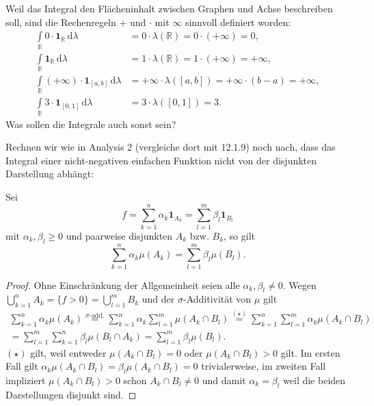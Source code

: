 \begin{beispiel1}
Weil das Integral den \glqq Fl\"acheninhalt\grqq{} zwischen Graphen und Achse beschreiben soll, sind die Rechenregeln $+$ und $\cdot$ mit $\infty$ sinnvoll definiert worden:
\begin{align*}
	 \int\limits_{\mathbb{R}} 0 \cdot \mathbf {1}_{\mathbb R} \,\mathrm{d}\lambda  &= 0\cdot \lambda(\mathbb{R} )= 0 \cdot (+\infty) = 0,\\
	 \int\limits_{\mathbb{R}} \mathbf{1}_{\mathbb R}\, \mathrm{d}\lambda &= 1 \cdot \lambda(\mathbb{R})= 1 \cdot (+\infty) = +\infty,\\
	 \int\limits_{\mathbb{R}} (+\infty)\cdot  \mathbf{1}_{[a,b]} \,\mathrm{d}\lambda &= +\infty \cdot \lambda([a,b] )= +\infty\cdot (b-a)=+\infty,\\
	 \int\limits_{\mathbb{R}} 3\cdot \mathbf{1}_{[0,1]}\, \mathrm{d}\lambda &= 3 \cdot \lambda([0,1] )= 3. 
\end{align*} 	 
Was sollen die Integrale auch sonst sein?
\end{beispiel1}

Rechnen wir wie in Analysis 2 (vergleiche dort mit 12.1.9) noch nach, dass das Integral einer nicht-negativen einfachen Funktion nicht von der disjunkten Darstellung abh\"angt:
\begin{lemma}
	Sei \[ f = \sum\limits_{k = 1}^{n} \alpha_k \mathbf{1}_{A_k} = \sum\limits_{l = 1}^{m} \beta_l \mathbf{1}_{B_l} \]
	mit $ \alpha_k, \beta_l \geq 0$ und paarweise disjunkten $A_k$ bzw. $B_k$, so gilt \[ \sum\limits_{k = 1}^{n} \alpha_k \mu(A_k) = \sum\limits_{l = 1}^{m} \beta_l \mu(B_l). \]
\end{lemma}

\begin{proof}
	Ohne Einschr\"ankung der Allgemeinheit seien alle $\alpha_k, \beta_l \neq 0$. Wegen $\bigcup_{k=1}^n A_k=\{f>0\}=\bigcup_{l=1}^mB_k$ und der $\sigma$-Additivit\"at von $\mu$ gilt	\begin{gather*}
		\sum\limits_{k = 1}^{n} \alpha_k \mu(A_k) \overset{\sigma\text{-add.}}{=} \sum\limits_{k = 1}^{n} \alpha_k \sum\limits_{l = 1}^{m} \mu(A_k \cap B_l) \overset{(\star)}{=} \sum\limits_{k = 1}^{n} \sum\limits_{l = 1}^{m} \alpha_k\mu(A_k \cap B_l)\\
		= \sum\limits_{l = 1}^{m} \sum\limits_{k = 1}^{n}\beta_l \mu(B_l \cap A_k) = \sum\limits_{l = 1}^{m} \beta_l \mu(B_l).
	\end{gather*}
	$(\star)$ gilt, weil entweder $\mu(A_k\cap B_l)=0$ oder $\mu(A_k\cap B_l)>0$ gilt. Im ersten Fall gilt  $\alpha_k\mu(A_k\cap B_l)=\beta_l\mu(A_k\cap B_l)=0$ trivialerweise, im zweiten Fall impliziert $\mu(A_k\cap B_l)>0$ schon $A_k \cap B_l \neq 0$ und damit $\alpha_k=\beta_l$ weil die beiden Darstellungen disjunkt sind.
\end{proof}


